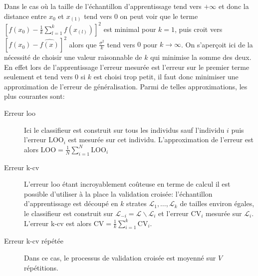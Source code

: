Dans le cas où la taille de l'échantillon d'apprentissage tend vers $+ \infty$ et donc la distance entre $x_0$ et $x_{(1)}$ tend vers $0$ on peut voir que le terme $\left[ f(x_0) - \frac{1}{k} \sum_{l=1}^k f(x_{(l)}) \right]^2$ est minimal pour $k=1$, puis croit vers $\left[ f(x_0) - \hat{f(x)} \right]^2$ alors que $\frac{\sigma^2}{k}$ tend vers $0$ pour $k \to \infty$. On s'aperçoit ici de la nécessité de choisir une valeur raisonnable de $k$ qui minimise la somme des deux. En effet lors de l'apprentissage l'erreur mesurée est l'erreur sur le premier terme seulement et tend vers $0$ si $k$ est choisi trop petit, il faut donc minimiser une approximation de l'erreur de généralisation. Parmi de telles approximations, les plus courantes sont:
\begin{description}
    \item[Erreur \ac{loo}] Ici le classifieur est construit sur tous les individus sauf l'individu $i$ puis l'erreur $\mathrm{LOO}_i$ est mesurée sur cet individu. L'approximation de l'erreur est alors $\mathrm{LOO} = \frac{1}{N} \sum_{i=1}^N \mathrm{LOO}_i$
    \item[Erreur \ac{k-cv}] L'erreur \ac{loo} étant incroyablement coûteuse en terme de calcul il est possible d'utiliser à la place la validation croisée: l'échantillon d'apprentissage est découpé en $k$ strates $\mathcal{L}_1,\dotsc,\mathcal{L}_k$ de tailles environ égales, le classifieur est construit sur $\mathcal{L}_{-i} = \mathcal{L} \smallsetminus \mathcal{L}_i$ et l'erreur $\mathrm{CV}_i$ mesurée sur $\mathcal{L}_i$. L'erreur \ac{k-cv} est alors $\mathrm{CV} = \frac{1}{k} \sum_{i=1}^k \mathrm{CV}_i$.
    \item[Erreur \ac{k-cv} répétée] Dans ce cas, le processus de validation croisée est moyenné sur $V$ répétitions.
\end{description}

